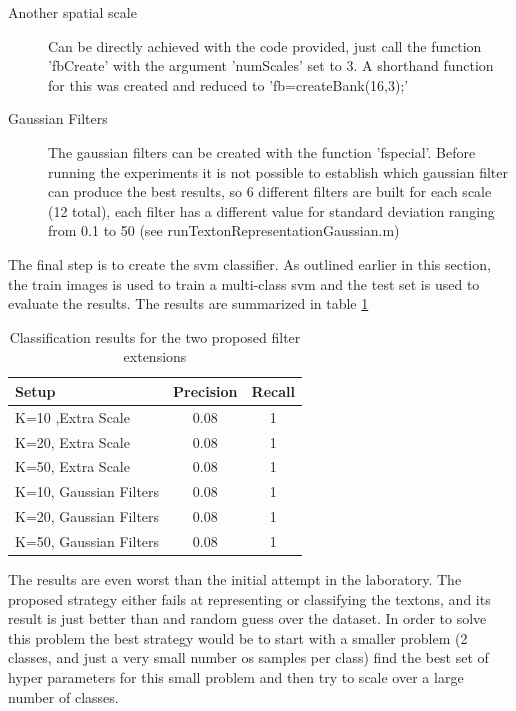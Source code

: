 \documentclass[10pt,twocolumn,letterpaper]{article}
\begin{document}
\begin{description}

\item[Another spatial scale] Can be directly achieved with the code provided, just call the function  'fbCreate' with the argument 'numScales' set to 3. A shorthand function for this was created and reduced to 'fb=createBank(16,3);'

\item[Gaussian Filters] The gaussian filters can be created with the function 'fspecial'. Before running the experiments it is not possible to establish which gaussian filter can produce the best results, so 6 different filters are built for each scale (12 total), each filter has a different value for standard deviation ranging from 0.1 to 50 (see runTextonRepresentationGaussian.m)

\end{description}

The final step is to create the svm classifier. As outlined earlier in this section, the train images is used to train a multi-class svm and the test set is used to evaluate the results. The results are summarized in table \ref{table:extraPR}

\begin{table}[ht!]
\centering
\begin{tabular}{ l | c | c  }
Setup & Precision & Recall    \\
\hline	
K=10 ,Extra Scale & 0.08 & 1  \\
K=20, Extra Scale & 0.08 & 1  \\
K=50, Extra Scale & 0.08 & 1  \\
K=10, Gaussian Filters & 0.08 & 1 \\
K=20, Gaussian Filters & 0.08 & 1 \\
K=50, Gaussian Filters & 0.08 & 1  \\

\end{tabular}
\caption{Classification results for the two proposed filter extensions}
\label{table:extraPR}
\end{table}


The results are even worst than the initial attempt in the laboratory. The proposed strategy either fails at representing or classifying the textons, and its result is just better than and random guess over the dataset. In order to solve this problem the best strategy would be to start with a smaller problem (2 classes, and just a very small number os samples per class) find the best set of hyper parameters for this small problem and then try to scale over a large number of classes.
\end{document}
